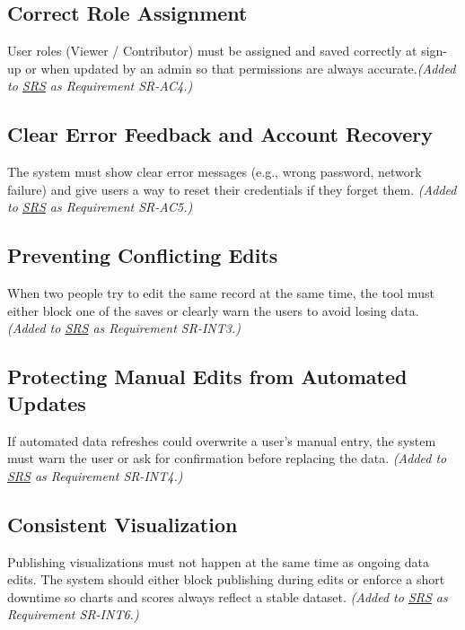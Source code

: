 \documentclass{article}
\begin{document}
\subsection*{Correct Role Assignment}
User roles (Viewer / Contributor) must be assigned and saved correctly at sign-up or when updated by an admin so that permissions are always accurate.\textit{(Added to \href{https://github.com/thaafei/DomainX/blob/main/docs/SRS/SRS.pdf}{SRS} as Requirement SR-AC4.)}

\subsection*{Clear Error Feedback and Account Recovery}
The system must show clear error messages (e.g., wrong password, network failure) and give users a way to reset their credentials if they forget them. \textit{(Added to \href{https://github.com/thaafei/DomainX/blob/main/docs/SRS/SRS.pdf}{SRS} as Requirement SR-AC5.)}

\subsection*{Preventing Conflicting Edits}
When two people try to edit the same record at the same time, the tool must either block one of the saves or clearly warn the users to avoid losing data. \textit{(Added to \href{https://github.com/thaafei/DomainX/blob/main/docs/SRS/SRS.pdf}{SRS} as Requirement SR-INT3.)}

\subsection*{Protecting Manual Edits from Automated Updates}
If automated data refreshes could overwrite a user’s manual entry, the system must warn the user or ask for confirmation before replacing the data. \textit{(Added to \href{https://github.com/thaafei/DomainX/blob/main/docs/SRS/SRS.pdf}{SRS} as Requirement SR-INT4.)}


\subsection*{Consistent Visualization}
Publishing visualizations must not happen at the same time as ongoing data edits.
The system should either block publishing during edits or enforce a short downtime so charts and scores always reflect a stable dataset. \textit{(Added to \href{https://github.com/thaafei/DomainX/blob/main/docs/SRS/SRS.pdf}{SRS} as Requirement SR-INT6.)}
\end{document}

